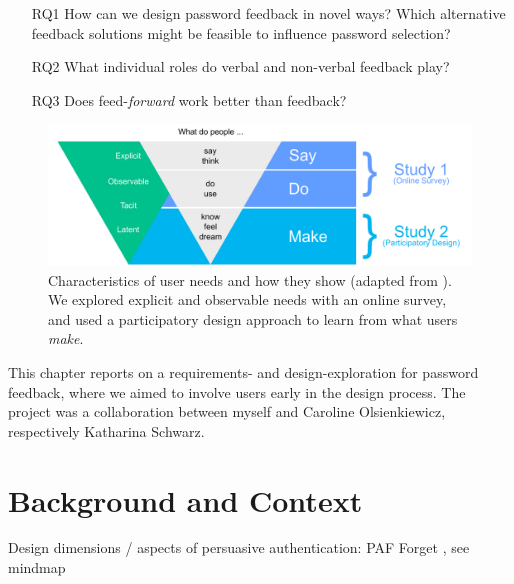 \begin{itemize}
	\item[RQ1] How can we design password feedback in novel ways? Which alternative feedback solutions might be feasible to influence password selection?
	\item[RQ2] What individual roles do verbal and non-verbal feedback play?
	\item[RQ3] Does feed-\textit{forward} work better than feedback?
\end{itemize}


\begin{figure}
	\centering
	\includegraphics[width=\linewidth]{figures/co-design/exploration-overview}
	\caption{\label{fig:co-design:exploration-overview} Characteristics of user needs and how they show (adapted from  \cite{Sanders2002ParticipatoryDesign}). We explored explicit and observable needs with an online survey, and used a participatory design approach to learn from what users \textit{make}.}
\end{figure}

This chapter reports on a requirements- and design-exploration for password feedback, where we aimed to involve users early in the design process. The project was a collaboration between myself and Caroline Olsienkiewicz, respectively Katharina Schwarz. 

\section{Background and Context}

Design dimensions / aspects of persuasive authentication: PAF Forget \etal \cite{Forget2007PersuasionEducationSecurity}, see mindmap



		
		


